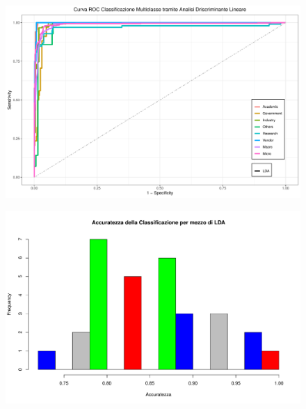 \documentclass[11pt,a4paper]{article}
\begin{document}
\begin{figure}[H]
	\vspace{-0.1cm}
	\hspace{-1.0cm}
	\includegraphics[scale=.61]{imgs/LDA_ggplot.pdf}
\end{figure}
\clearpage
\begin{figure}[H]
	\vspace{-2.0cm}
	\hspace{-1.0cm}
	\includegraphics[scale=.65]{imgs/LDA_hist.pdf}
\end{figure}
\end{document}
